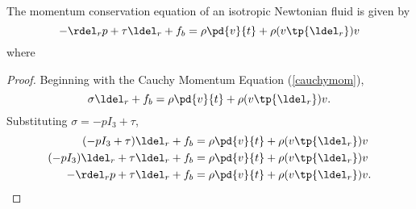 \begin{thm}
The momentum conservation equation of an isotropic Newtonian fluid is given
by
\begin{equation}
    -\rdel_r p + \tau \ldel_r + f_b = \rho \pd{v}{t} + \rho (v \tp{\ldel_r}) v
\end{equation}
where
\end{thm}
\begin{proof}
Beginning with the Cauchy Momentum Equation (\autoref{cauchymom}),
\begin{equation}
    \sigma \ldel_r + f_b = \rho \pd{v}{t} + \rho (v \tp{\ldel_r}) v.
\end{equation}
Substituting $\sigma = -p I_3 + \tau$,
\begin{align}
    (-p I_3 + \tau) \ldel_r + f_b &= \rho \pd{v}{t} + \rho (v \tp{\ldel_r}) v \\
    (-p I_3)\ldel_r + \tau \ldel_r + f_b &= \rho \pd{v}{t} + \rho (v \tp{\ldel_r}) v \\
    -\rdel_r p + \tau \ldel_r + f_b &= \rho \pd{v}{t} + \rho (v \tp{\ldel_r}) v.
\end{align}
\end{proof}

